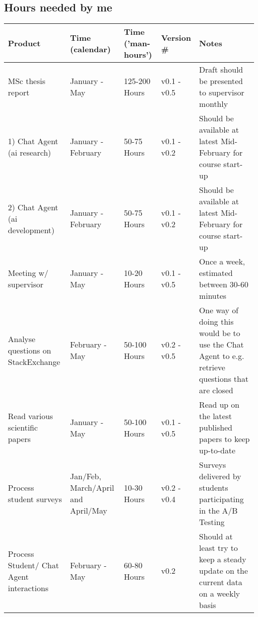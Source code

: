 \subsection{Hours needed by me}
\label{chapter5:hours_needed_by_me}
\begin{center}
	\begin{tabular}{| p{4cm} | p{2.5cm} | l |  l | p{4cm} |}
		\hline
		Product & Time (calendar) & Time ('man-hours')\footnotemark & Version \# & Notes  \\
		\hline
		MSc thesis report & January - May & 125-200 Hours & v0.1 - v0.5 & Draft should be presented to supervisor monthly \\ 
		\hline
		1) Chat Agent \newline (\gls{ai} research) & January - \newline February & 50-75 Hours & v0.1 - v0.2 &  Should be available at \newline latest Mid-February for 
		\newline course start-up \\ 
		\hline
		2) Chat Agent \newline (\gls{ai} development) & January -\newline  February & 50-75 Hours & v0.1 - v0.2 & Should be available at \newline latest Mid-February for 
		\newline course start-up \\ 
		\hline
		Meeting w/ supervisor & January - May & 10-20 Hours & v0.1 - v0.5 & Once a week, estimated between 30-60 minutes \\ 
		\hline
		Analyse questions \newline on StackExchange & February - May & 50-100 Hours & v0.2 - v0.5 & One way of doing this \newline would be to use the 
		\newline Chat Agent to e.g. \newline retrieve questions \newline that are closed \\ 
		\hline
		Read various scientific \newline papers & January - May & 50-100 Hours & v0.1 - v0.5 & Read up on the latest \newline published papers to keep up-to-date \\ 
		\hline
		Process student surveys & Jan/Feb, March/April and April/May & 10-30 Hours & v0.2 - v0.4 & Surveys delivered by \newline students participating in \newline the A/B Testing \\ 
		\hline
		Process Student/ \newline Chat Agent interactions & February - May & 60-80 Hours & v0.2 & Should at least try to 
		\newline keep a steady update on \newline the current data on \newline a weekly basis \\ 
		\hline
	\end{tabular}
\end{center}
	
